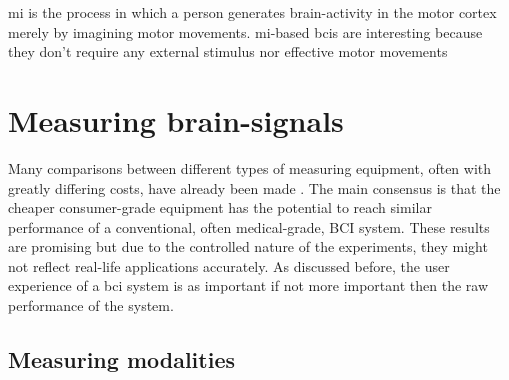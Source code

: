 \Gls{mi} is the process in which a person generates brain-activity in the motor cortex merely by imagining motor movements.
\Gls{mi}-based \glspl{bci} are interesting because they don't require any external stimulus nor effective motor movements

\lipsum[1-3]



\section{Measuring brain-signals}
\label{sec:biomedical_signals_measuring}


Many comparisons between different types of measuring equipment, often with greatly differing costs, have already been made \citep{bci_cheap_viability1, bci_cheap_viability2, bci_cheap_viability3, bci_cheap_viability4, bci_cheap_viability5}.
The main consensus is that the cheaper consumer-grade equipment has the potential to reach similar performance of a conventional, often medical-grade, BCI system.
These results are promising but due to the controlled nature of the experiments, they might not reflect real-life applications accurately.
As discussed before, the user experience of a \gls{bci} system is as important if not more important then the raw performance of the system.


\subsection{Measuring modalities}
\label{subsec:biomedical_signals_measuring_modalities}

